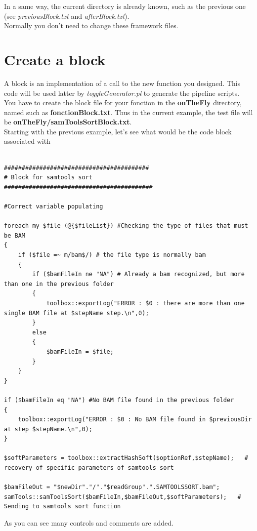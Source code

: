 \documentclass[a4paper,10pt]{report}
\begin{document}
In a same way, the current directory is already known, such as the previous one (see \emph{previousBlock.txt} and \emph{afterBlock.txt}). \\

Normally you don't need to change these framework files.

\section{Create a block}

A block is an implementation of a call to the new function you designed. This code will be used latter by \textit{toggleGenerator.pl} to generate the pipeline scripts. You have to create the block file for your fonction in the \textbf{onTheFly} directory, named such as \textbf{fonctionBlock.txt}. Thus in the current example, the test file will be \textbf{onTheFly/samToolsSortBlock.txt}. \\

Starting with the previous example, let's see what would be the code block associated with

\begin{lstlisting}

#########################################
# Block for samtools sort
##########################################

#Correct variable populating

foreach my $file (@{$fileList}) #Checking the type of files that must be BAM
{
    if ($file =~ m/bam$/) # the file type is normally bam
    {
        if ($bamFileIn ne "NA") # Already a bam recognized, but more than one in the previous folder
        {
            toolbox::exportLog("ERROR : $0 : there are more than one single BAM file at $stepName step.\n",0);
        }
        else
        {
            $bamFileIn = $file;
        }
    }
}

if ($bamFileIn eq "NA") #No BAM file found in the previous folder
{
    toolbox::exportLog("ERROR : $0 : No BAM file found in $previousDir at step $stepName.\n",0);
}

$softParameters = toolbox::extractHashSoft($optionRef,$stepName);   # recovery of specific parameters of samtools sort

$bamFileOut = "$newDir"."/"."$readGroup".".SAMTOOLSSORT.bam";
samTools::samToolsSort($bamFileIn,$bamFileOut,$softParameters);   # Sending to samtools sort function
\end{lstlisting}

As you can see many controls and comments are added.\\
\end{document}
